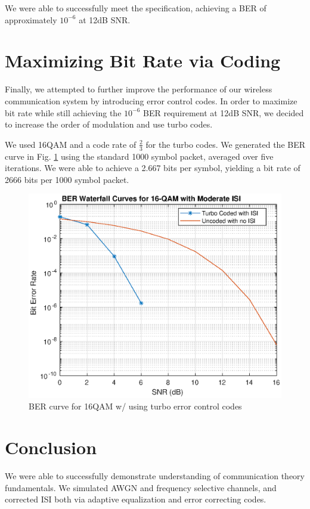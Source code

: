 \documentclass[conference]{IEEEtran}
\begin{document}
We were able to successfully meet the specification, achieving a BER of approximately $10^{-6}$ at 12dB SNR.
\section{Maximizing Bit Rate via Coding}
Finally, we attempted to further improve the performance of our wireless communication system by introducing error control codes. In order to maximize bit rate while still achieving the $10^{-6}$ BER requirement at 12dB SNR, we decided to increase the order of modulation and use turbo codes. 

We used 16QAM and a code rate of $\frac{2}{3}$ for the turbo codes. We generated the BER curve in Fig. \ref{turbo} using the standard 1000 symbol packet, averaged over five iterations. We were able to achieve a 2.667 bits per symbol, yielding a bit rate of 2666 bits per 1000 symbol packet.
\begin{figure}[htbp]
\centerline{\includegraphics[scale=.55]{./media/turbo.eps}}
\caption{BER curve for 16QAM w/ using turbo error control codes}
\label{turbo}
\end{figure}

\section{Conclusion}
We were able to successfully demonstrate understanding of communication theory fundamentals. We simulated AWGN and frequency selective channels, and corrected ISI both via adaptive equalization and error correcting codes.
\end{document}
